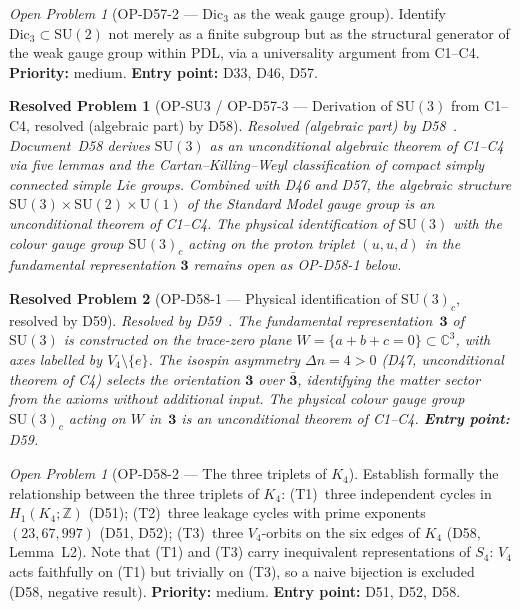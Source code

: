 \documentclass[11pt,a4paper]{article}
\newtheorem{resolvedproblem}{Resolved Problem}
\theoremstyle{plain}
\theoremstyle{definition}
\theoremstyle{remark}
\newtheorem{openproblem}[theorem]{Open Problem}
\begin{document}
\begin{openproblem}[OP-D57-2 --- $\mathrm{Dic}_3$ as the weak gauge group]
\label{op:Dic3}
Identify $\mathrm{Dic}_3 \subset \mathrm{SU}(2)$ not merely as a finite subgroup but as the structural generator of the weak gauge group within PDL, via a universality argument from C1--C4. \textbf{Priority:} medium. \textbf{Entry point:} D33, D46, D57.
\end{openproblem}

\begin{resolvedproblem}[OP-SU3 / OP-D57-3 --- Derivation of $\mathrm{SU}(3)$ from C1--C4, resolved (algebraic part) by D58]
\label{op:SU3}
\textcolor{proofblue}{Resolved (algebraic part) by D58~\cite{D58}.} Document~D58 derives $\mathrm{SU}(3)$ as an unconditional algebraic theorem of C1--C4 via five lemmas and the Cartan--Killing--Weyl classification of compact simply connected simple Lie groups. Combined with D46 and D57, the algebraic structure $\mathrm{SU}(3)\times\mathrm{SU}(2)\times\mathrm{U}(1)$ of the Standard Model gauge group is an unconditional theorem of C1--C4. The physical identification of $\mathrm{SU}(3)$ with the colour gauge group $\mathrm{SU}(3)_c$ acting on the proton triplet $(u,u,d)$ in the fundamental representation $\mathbf{3}$ remains open as OP-D58-1 below.
\end{resolvedproblem}

\begin{resolvedproblem}[OP-D58-1 --- Physical identification of $\mathrm{SU}(3)_c$, resolved by D59]
\label{op:D58one}
\textcolor{proofblue}{Resolved by D59~\cite{D59}.} The fundamental representation~$\mathbf{3}$ of $\mathrm{SU}(3)$ is constructed on the trace-zero plane $W = \{a+b+c=0\}\subset\mathbb{C}^3$, with axes labelled by $V_4\setminus\{e\}$. The isospin asymmetry $\Delta n = 4 > 0$ (D47, unconditional theorem of C4) selects the orientation $\mathbf{3}$ over $\bar{\mathbf{3}}$, identifying the matter sector from the axioms without additional input. The physical colour gauge group $\mathrm{SU}(3)_c$ acting on $W$ in~$\mathbf{3}$ is an unconditional theorem of C1--C4. \textbf{Entry point:} D59.
\end{resolvedproblem}

\begin{openproblem}[OP-D58-2 --- The three triplets of $K_4$]
\label{op:D58two}
Establish formally the relationship between the three triplets of $K_4$: (T1)~three independent cycles in $H_1(K_4;\mathbb{Z})$ (D51); (T2)~three leakage cycles with prime exponents $(23,67,997)$ (D51, D52); (T3)~three $V_4$-orbits on the six edges of $K_4$ (D58, Lemma~L2). Note that (T1) and (T3) carry inequivalent representations of $S_4$: $V_4$ acts faithfully on (T1) but trivially on (T3), so a naive bijection is excluded (D58, negative result). \textbf{Priority:} medium. \textbf{Entry point:} D51, D52, D58.
\end{openproblem}
\end{document}
